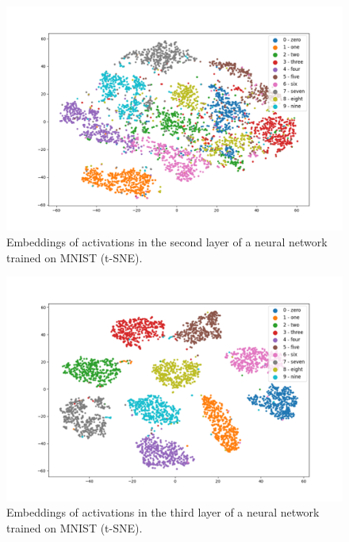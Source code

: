 \documentclass{article}
\begin{document}
\begin{figure}
  \centering
    \includegraphics[width=1.0\textwidth]{../../out/activations_cnn/mnist/t-sne/trained/plot_l2_f0.png}
    \caption{Embeddings of activations in the second layer of a neural network trained on MNIST (t-SNE).}
\end{figure}

\begin{figure}
  \centering
    \includegraphics[width=1.0\textwidth]{../../out/activations_cnn/mnist/t-sne/trained/plot_l3.png}
    \caption{Embeddings of activations in the third layer of a neural network trained on MNIST (t-SNE).}
\end{figure}
\end{document}
